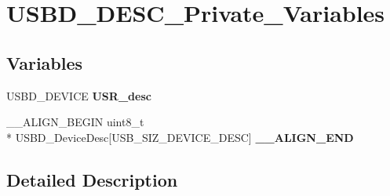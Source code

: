\hypertarget{group__USBD__DESC__Private__Variables}{\section{U\-S\-B\-D\-\_\-\-D\-E\-S\-C\-\_\-\-Private\-\_\-\-Variables}
\label{group__USBD__DESC__Private__Variables}
}
\subsection*{Variables}
\begin{DoxyCompactItemize}
\item 
U\-S\-B\-D\-\_\-\-D\-E\-V\-I\-C\-E {\bfseries U\-S\-R\-\_\-desc}
\item 
\-\_\-\-\_\-\-A\-L\-I\-G\-N\-\_\-\-B\-E\-G\-I\-N uint8\-\_\-t \\*
U\-S\-B\-D\-\_\-\-Device\-Desc\mbox{[}U\-S\-B\-\_\-\-S\-I\-Z\-\_\-\-D\-E\-V\-I\-C\-E\-\_\-\-D\-E\-S\-C\mbox{]} {\bfseries \-\_\-\-\_\-\-A\-L\-I\-G\-N\-\_\-\-E\-N\-D}
\end{DoxyCompactItemize}


\subsection{Detailed Description}


